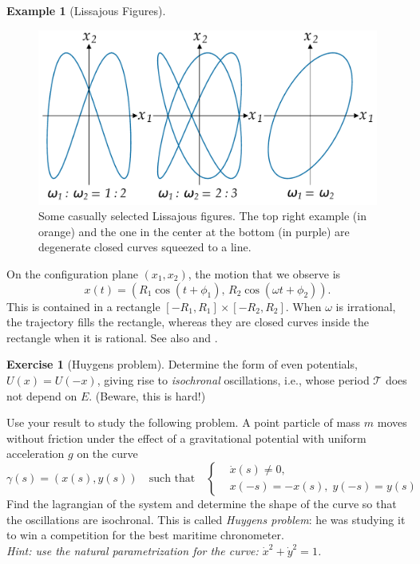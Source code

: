 \documentclass[english,fontsize=11pt,paper=b5]{scrbook}
\theoremstyle{definition}
\newtheorem{example}{Example}[chapter]
\newtheorem{exercise}{Exercise}[chapter]
\begin{document}
\begin{example}[Lissajous Figures]
      \begin{figure}[ht]
        \centering
        \includegraphics[width=.75\linewidth,trim={0 50pt 0 50pt},clip]{images/lissajous.pdf}
        \caption{Some casually selected Lissajous figures. The top right example (in orange) and the one in the center at the bottom (in purple) are degenerate closed curves squeezed to a line.}
        \label{img:lissajous}
      \end{figure}

      On the configuration plane $(x_1, x_2)$, the motion that we observe is
      \begin{equation}
        x(t) = \left( R_1 \cos(t + \phi_1),\, R_2 \cos(\omega t + \phi_2) \right).
      \end{equation}
      This is contained in a rectangle $[-R_1,R_1]\times[-R_2,R_2]$. When $\omega$ is irrational, the trajectory fills the rectangle, whereas they are closed curves inside the rectangle when it is rational.
      See also \cite[Exercise 6.34]{book:knauf} and \cite[Chapter 2.5, Example 2]{book:arnold}.
    \end{example}

    \begin{exercise}[Huygens problem]
      Determine the form of even potentials, $U(x) = U(-x)$, giving rise to \emph{isochronal} oscillations, i.e., whose period $\mathcal{T}$ does not depend on $E$. (Beware, this is hard!)

      Use your result to study the following problem.
      A point particle of mass $m$ moves without friction under the effect of a gravitational potential with uniform acceleration $g$ on the curve
      \begin{equation}
        \gamma(s) = (x(s), y(s)) \quad\mbox{such that}\quad
        \left\lbrace
          \begin{aligned}
       & \dot x(s) \neq 0,              \\
       & x(-s) = -x(s), \; y(-s) = y(s)
          \end{aligned}
        \right.
      \end{equation}
      Find the lagrangian of the system and determine the shape of the curve so that the oscillations are isochronal.
      This is called \emph{Huygens problem}: he was studying it to win a competition for the best maritime chronometer.\\
      \textit{Hint: use the natural parametrization for the curve: $\dot x^2 + \dot y^2 = 1$.}
    \end{exercise}
\end{document}
